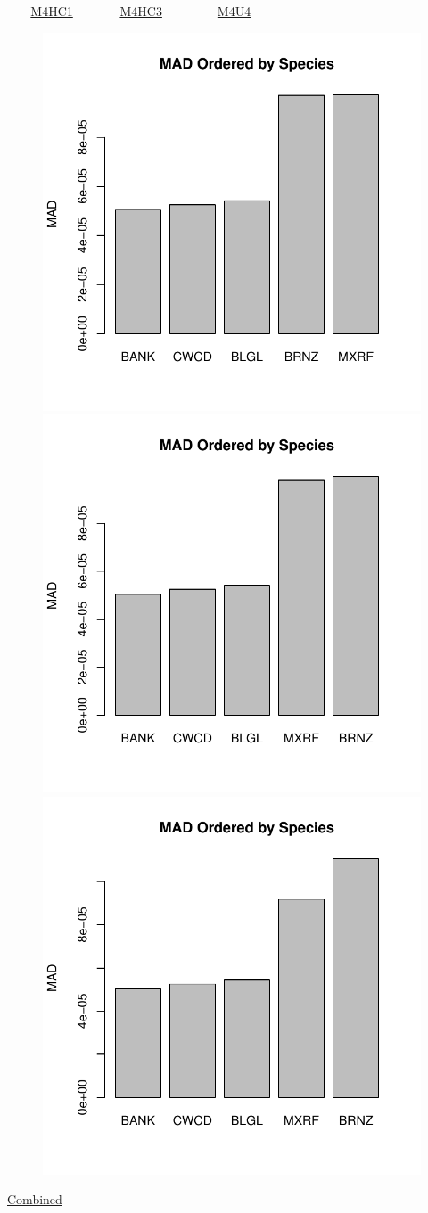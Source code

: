 \documentclass[ xcolor = pdftex, dvipsnames, table ]{beamer}
\begin{document}
\begin{frame}{$~~~~~~~$ \href{https://github.com/gasduster99/sppComp/tree/master/sscRuns/25019781982M4HC1}{M4HC1} $~~~~~~~~~~~~~~$ \href{https://github.com/gasduster99/sppComp/tree/master/sscRuns/25019781982M4HC3}{M4HC3} $~~~~~~~~~~~~~~~~~$ \href{https://github.com/gasduster99/sppComp/tree/master/sscRuns/25019781982M4U4}{M4U4} }
        \begin{figure}[ht!]
        \centering
        \hspace*{-1cm}
        \includegraphics[width=.4\textwidth]{../sscRuns/25019781982M4HC1/sppTailMad68.pdf}
        \includegraphics[width=.4\textwidth]{../sscRuns/25019781982M4HC3/sppTailMad68.pdf}
        \includegraphics[width=.4\textwidth]{../sscRuns/25019781982M4U4/sppTailMad68.pdf}
        \end{figure}
	\vspace{-1cm}
	\begin{center}
	\Large
	\href{https://github.com/gasduster99/sppComp/tree/master/try1/postSSC/25019781982M4HC1HC3U4}{Combined}
	\end{center}
\end{frame}
\end{document}
